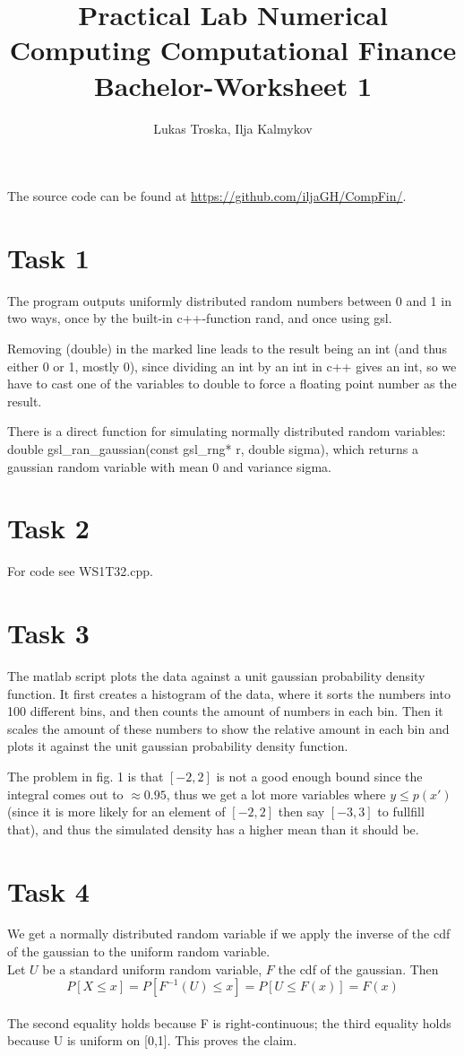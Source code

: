 \documentclass[]{article}
\title{Practical Lab Numerical Computing Computational Finance \\Bachelor-Worksheet 1}
\author{Lukas Troska, Ilja Kalmykov}
\date{}
\begin{document}
\maketitle 

The source code can be found at \url{https://github.com/iljaGH/CompFin/}.

\section*{Task 1} The program outputs uniformly distributed random
numbers between 0 and 1 in two ways, once by the built-in c++-function rand, and
once using gsl.

Removing (double) in the marked line leads to the result being an int (and thus
either 0 or 1, mostly 0), since dividing an int by an int in c++ gives an int,
so we have to cast one of the variables to double to force a floating point
number as the result.

There is a direct function for simulating normally distributed random variables:
double gsl\_ran\_gaussian(const gsl\_rng* r, double sigma), which returns a
gaussian random variable with mean 0 and variance sigma.

\section*{Task 2}
For code see WS1T32.cpp.

\section*{Task 3} The matlab script plots the data against a unit gaussian
probability density function. It first creates a histogram of the data, where it
sorts the numbers into 100 different bins, and then counts the amount of numbers
in each bin. Then it scales the amount of these numbers to show the relative
amount in each bin and plots it against the unit gaussian probability density
function.

The problem in fig. 1 is that $[-2,2]$ is not a good enough bound since the
integral comes out to $\approx 0.95$, thus we get a lot more variables where
$y\le p(x')$ (since it is more likely for an element of $[-2,2]$ then say
$[-3,3]$ to fullfill that), and thus the simulated density has a higher mean
than it should be.

\section*{Task 4} We get a normally distributed random variable if we apply the
inverse of the cdf of the gaussian to the uniform random variable.\\
Let $U$ be a standard uniform random variable, $F$ the cdf of the gaussian. Then
\[P\left[X\le x\right]=P\left[F^{-1}(U) \le x\right]=P\left[U \le
F(x)\right]=F(x)\]\\
The second equality holds because F is right-continuous; the third
equality holds because U is uniform on [0,1]. This proves the claim.
\end{document}

